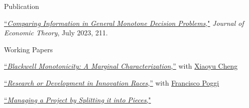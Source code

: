 \begin{rSection}{Publication}
	
	\begin{etaremune}
		\item \href{https://yonggyun-yg-kim.github.io/files/Research%20papers/GMDP_JET.pdf}{``\textit{Comparing Information in General Monotone Decision Problems},"} 
		\textit{Journal of Economic Theory}, July 2023, 211. 
		
	\end{etaremune}
	
	
	
\end{rSection}

\begin{rSection}{Working Papers}
	
	\begin{etaremune}
		
		\item
		 \href{https://yonggyun-yg-kim.github.io/files/Research%20papers/BMIC.pdf}{``\textit{Blackwell Monotonicity: A Marginal Characterization},''} with \href{https://xiaoyu-cheng.com/}{Xiaoyu Cheng}
		
		\item \href{https://yonggyun-yg-kim.github.io/files/Research%20papers/RDIR.pdf}{``\textit{Research or Development in Innovation Races},''}   with \href{https://www.franciscopoggi.com/}{Francisco Poggi}
		
		\item \href{https://yonggyun-yg-kim.github.io/files/Research%20papers/Managing%20a%20Project%20by%20Splitting%20it%20into%20Pieces.pdf}{``\textit{Managing a Project by Splitting it into Pieces},"} 

	\end{etaremune}
	
	
\end{rSection}


